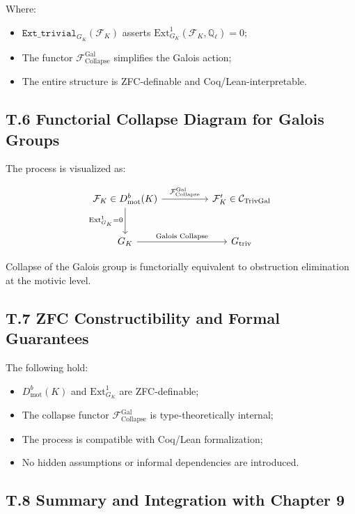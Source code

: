 \documentclass[11pt]{article}
\begin{document}
Where:
\begin{itemize}
    \item $\texttt{Ext\_trivial}_{G_K}(\mathcal{F}_K)$ asserts $\mathrm{Ext}^1_{G_K}(\mathcal{F}_K, \mathbb{Q}_\ell) = 0$;
    \item The functor $\mathcal{F}_{\mathrm{Collapse}}^{\mathrm{Gal}}$ simplifies the Galois action;
    \item The entire structure is ZFC-definable and Coq/Lean-interpretable.
\end{itemize}

\subsection*{T.6 Functorial Collapse Diagram for Galois Groups}

The process is visualized as:

\[
\begin{tikzcd}[column sep=huge, row sep=large]
\mathcal{F}_K \in D^b_{\mathrm{mot}}(K) \arrow[r, "{\mathcal{F}_{\mathrm{Collapse}}^{\mathrm{Gal}}}"] \arrow[d, swap, "{\mathrm{Ext}^1_{G_K} = 0}"]
& \mathcal{F}_K' \in \mathcal{C}_{\mathrm{TrivGal}} \\
G_K \arrow[r, "{\text{Galois Collapse}}"]
& G_{\mathrm{triv}}
\end{tikzcd}
\]

Collapse of the Galois group is functorially equivalent to obstruction elimination at the motivic level.

\subsection*{T.7 ZFC Constructibility and Formal Guarantees}

The following hold:

\begin{itemize}
    \item $D^b_{\mathrm{mot}}(K)$ and $\mathrm{Ext}^1_{G_K}$ are ZFC-definable;
    \item The collapse functor $\mathcal{F}_{\mathrm{Collapse}}^{\mathrm{Gal}}$ is type-theoretically internal;
    \item The process is compatible with Coq/Lean formalization;
    \item No hidden assumptions or informal dependencies are introduced.
\end{itemize}

\subsection*{T.8 Summary and Integration with Chapter 9}
\end{document}

